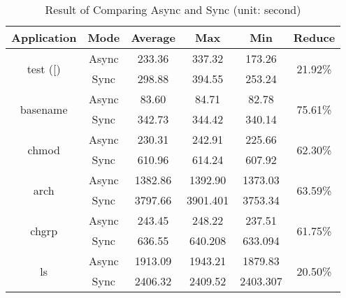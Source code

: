 \begin{table}[ht]
\centering
\begin{tabular}{|c|cccc|c|} 
\hline
Application               & \multicolumn{1}{c|}{Mode} & \multicolumn{1}{c|}{Average} & \multicolumn{1}{c|}{Max} & Min      & Reduce                    \\ 
\hline
\multirow{2}{*}{test ([)}        & Async                     & 233.36                       & 337.32                   & 173.26   & \multirow{2}{*}{21.92\%}  \\
                          & Sync                      & 298.88                       & 394.55                   & 253.24   &                           \\ 
\hline
\multirow{2}{*}{basename} & Async                     & 83.60                        & 84.71                    & 82.78    & \multirow{2}{*}{75.61\%}  \\
                          & Sync                      & 342.73                       & 344.42                   & 340.14   &                           \\ 
\hline
\multirow{2}{*}{chmod}    & Async                     & 230.31                       & 242.91                   & 225.66    & \multirow{2}{*}{62.30\%}  \\
                          & Sync                      & 610.96                       & 614.24                   & 607.92   &                           \\ 
\hline
\multirow{2}{*}{arch}     & Async                     & 1382.86                      & 1392.90                  & 1373.03  & \multirow{2}{*}{63.59\%}  \\
                          & Sync                      & 3797.66                      & 3901.401                 & 3753.34  &                           \\ 
\hline
\multirow{2}{*}{chgrp}    & Async                     & 243.45                       & 248.22                   & 237.51   & \multirow{2}{*}{61.75\%}  \\
                          & Sync                      & 636.55                       & 640.208                  & 633.094  &                           \\ 
\hline
\multirow{2}{*}{ls}       & Async                     & 1913.09                      & 1943.21                  & 1879.83  & \multirow{2}{*}{20.50\%}  \\
                          & Sync                      & 2406.32                      & 2409.52                  & 2403.307 &                           \\
\hline
\end{tabular}
\caption{Result of Comparing Async and Sync (unit: second)}
\label{result_compare}
\end{table}

